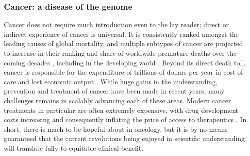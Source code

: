\documentclass[thesis.tex]{subfiles}
\begin{document}
\subsubsection{Cancer: a disease of the genome}
Cancer does not require much introduction even to the lay reader; direct or indirect experience of cancer is universal. It is consistently ranked amongst the leading causes of global mortality, and multiple subtypes of cancer are projected to increase in their ranking and share of worldwide premature deaths over the coming decades \citep{mathers_projections_2006}, including in the developing world \citep{kanavos_rising_2006}. Beyond its direct death toll, cancer is responsible for the expenditure of trillions of dollars per year in cost of care and lost economic output \citep{wild_world_2020}. While huge gains in the understanding, prevention and treatment of cancer have been made in recent years, many challenges remains in scalably advancing each of these areas. Modern cancer treatments in particular are often extremely expensive, with drug development costs increasing and consequently inflating the price of access to therapeutics \citep{howard_pricing_2015}. In short, there is much to be hopeful about in oncology, but it is by no means guaranteed that the current revolutions being enjoyed in scientific understanding will translate fully to equitable clinical benefit.
\end{document}
